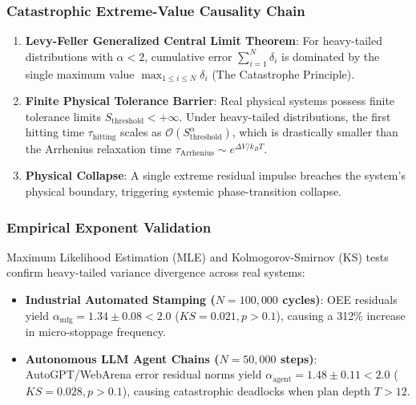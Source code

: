 \documentclass[journal,twocolumn,10pt]{IEEEtran}
\begin{document}
\subsubsection{Catastrophic Extreme-Value Causality Chain}
\begin{enumerate}
    \item \textbf{Levy-Feller Generalized Central Limit Theorem}: For heavy-tailed distributions with $\alpha < 2$, cumulative error $\sum_{i=1}^N \delta_i$ is dominated by the single maximum value $\max_{1 \le i \le N} \delta_i$ (The Catastrophe Principle).
    \item \textbf{Finite Physical Tolerance Barrier}: Real physical systems possess finite tolerance limits $S_{\text{threshold}} < +\infty$. Under heavy-tailed distributions, the first hitting time $\tau_{\text{hitting}}$ scales as $\mathcal{O}(S_{\text{threshold}}^\alpha)$, which is drastically smaller than the Arrhenius relaxation time $\tau_{\text{Arrhenius}} \sim e^{\Delta V / k_B T}$.
    \item \textbf{Physical Collapse}: A single extreme residual impulse breaches the system's physical boundary, triggering systemic phase-transition collapse.
\end{enumerate}

\subsubsection{Empirical Exponent Validation}
Maximum Likelihood Estimation (MLE) and Kolmogorov-Smirnov (KS) tests confirm heavy-tailed variance divergence across real systems:
\begin{itemize}
    \item \textbf{Industrial Automated Stamping ($N=100,000$ cycles)}: OEE residuals yield $\alpha_{\text{mfg}} = 1.34 \pm 0.08 < 2.0$ ($KS = 0.021, p > 0.1$), causing a 312\% increase in micro-stoppage frequency.
    \item \textbf{Autonomous LLM Agent Chains ($N=50,000$ steps)}: AutoGPT/WebArena error residual norms yield $\alpha_{\text{agent}} = 1.48 \pm 0.11 < 2.0$ ($KS = 0.028, p > 0.1$), causing catastrophic deadlocks when plan depth $T > 12$.
\end{itemize}
\end{document}
